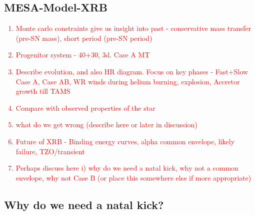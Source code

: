 \documentclass[linenumbers,trackchanges,twocolumn]{aastex701}
\newcommand{\red}{\textcolor{red}}
\begin{document}
\subsection{MESA-Model-XRB}

\red{
\begin{enumerate}
    \item Monte carlo constraints give us insight into past - conservative mass transfer (pre-SN mass), short period (pre-SN period)
    \item Progenitor system - 40+30, 3d. Case A MT
    \item Describe evolution, and also HR diagram. Focus on key phases - Fast+Slow Case A, Case AB, WR winds during helium burning, explosion, Accretor growth till TAMS
    \item Compare with observed properties of the star
    \item what do we get wrong (describe here or later in discussion)
    \item Future of XRB - Binding energy curves, alpha common envelope, likely failure, TZO/transient
    \item Perhaps discuss here i) why do we need a natal kick, why not a common envelope, why not Case B (or place this somewhere else if more appropriate)
\end{enumerate}
}

\subsection{Why do we need a natal kick?}
\end{document}
